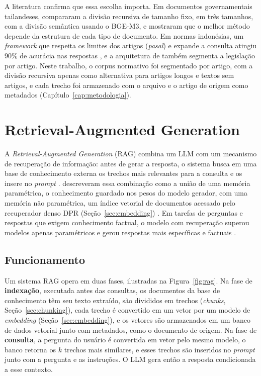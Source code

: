 A literatura confirma que essa escolha importa. Em documentos governamentais tailandeses,  compararam a divisão recursiva de tamanho fixo, em três tamanhos, com a divisão semântica usando o BGE-M3, e mostraram que o melhor método depende da estrutura de cada tipo de documento. Em normas indonésias, um \textit{framework} que respeita os limites dos artigos (\textit{pasal}) e expande a consulta atingiu 90\% de acurácia nas respostas \cite{Fiddina2026}, e a arquitetura de  também segmenta a legislação por artigo. Neste trabalho, o corpus normativo foi segmentado por artigo, com a divisão recursiva apenas como alternativa para artigos longos e textos sem artigos, e cada trecho foi armazenado com o arquivo e o artigo de origem como metadados (Capítulo~\ref{cap:metodologia}).

\section{Retrieval-Augmented Generation}
\label{sec:rag}

A \textit{Retrieval-Augmented Generation} (RAG) combina um LLM com um mecanismo de recuperação de informação: antes de gerar a resposta, o sistema busca em uma base de conhecimento externa os trechos mais relevantes para a consulta e os insere no \textit{prompt} \cite{Lewis2020,Gao2023}.  descreveram essa combinação como a união de uma memória paramétrica, o conhecimento guardado nos pesos do modelo gerador, com uma memória não paramétrica, um índice vetorial de documentos acessado pelo recuperador denso DPR (Seção~\ref{sec:embedding}) \cite{Karpukhin2020}. Em tarefas de perguntas e respostas que exigem conhecimento factual, o modelo com recuperação superou modelos apenas paramétricos e gerou respostas mais específicas e factuais \cite{Lewis2020}.

\subsection{Funcionamento}

Um sistema RAG opera em duas fases, ilustradas na Figura~\ref{fig:rag}. Na fase de \textbf{indexação}, executada antes das consultas, os documentos da base de conhecimento têm seu texto extraído, são divididos em trechos (\textit{chunks}, Seção~\ref{sec:chunking}), cada trecho é convertido em um vetor por um modelo de \textit{embedding} (Seção~\ref{sec:embedding}), e os vetores são armazenados em um banco de dados vetorial junto com metadados, como o documento de origem. Na fase de \textbf{consulta}, a pergunta do usuário é convertida em vetor pelo mesmo modelo, o banco retorna os $k$ trechos mais similares, e esses trechos são inseridos no \textit{prompt} junto com a pergunta e as instruções. O LLM gera então a resposta condicionada a esse contexto.

